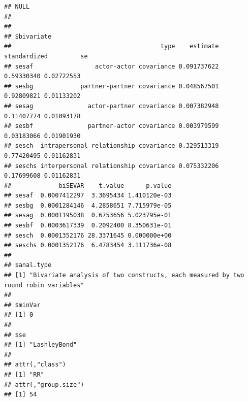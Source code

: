 \documentclass[a4paper]{article}\usepackage[]{graphicx}\usepackage[]{color}
\makeatletter
\newenvironment{kframe}{%
 \def\at@end@of@kframe{}%
 \ifinner\ifhmode%
  \def\at@end@of@kframe{\end{minipage}}%
  \begin{minipage}{\columnwidth}%
 \fi\fi%
 \def\FrameCommand##1{\hskip\@totalleftmargin \hskip-\fboxsep
 \colorbox{shadecolor}{##1}\hskip-\fboxsep
     \hskip-\linewidth \hskip-\@totalleftmargin \hskip\columnwidth}%
 \MakeFramed {\advance\hsize-\width
   \@totalleftmargin\z@ \linewidth\hsize
   \@setminipage}}%
 {\par\unskip\endMakeFramed%
 \at@end@of@kframe}
\newenvironment{knitrout}{}{} %
\makeatother
\begin{document}
\begin{knitrout}
\begin{kframe}
\begin{verbatim}
## NULL
## 
## 
## $bivariate
##                                         type    estimate standardized         se
## sesaf                 actor-actor covariance 0.091737622   0.59330340 0.02722553
## sesbg             partner-partner covariance 0.048567501   0.92809821 0.01133202
## sesag               actor-partner covariance 0.007382948   0.11407774 0.01093178
## sesbf               partner-actor covariance 0.003979599   0.03183066 0.01901930
## sesch  intrapersonal relationship covariance 0.329513319   0.77420495 0.01162831
## seschs interpersonal relationship covariance 0.075332206   0.17699608 0.01162831
##             biSEVAR    t.value      p.value
## sesaf  0.0007412297  3.3695434 1.410120e-03
## sesbg  0.0001284146  4.2858651 7.715979e-05
## sesag  0.0001195038  0.6753656 5.023795e-01
## sesbf  0.0003617339  0.2092400 8.350631e-01
## sesch  0.0001352176 28.3371645 0.000000e+00
## seschs 0.0001352176  6.4783454 3.111736e-08
## 
## $anal.type
## [1] "Bivariate analysis of two constructs, each measured by two round robin variables"
## 
## $minVar
## [1] 0
## 
## $se
## [1] "LashleyBond"
## 
## attr(,"class")
## [1] "RR"
## attr(,"group.size")
## [1] 54
\end{verbatim}
\end{kframe}
\end{knitrout}
\par\vspace{5mm}
\end{document}
